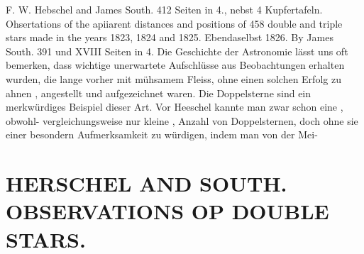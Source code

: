 \documentclass[12pt,a4paper]{article}
\begin{document}
{{{{{{{{ F.  W.  Hebschel and  James  South.    412  Seiten  in  4.,  nebst  4  Kupfertafeln. Ohsertations  of  the  apiiarent  distances  and  positions  of  458  double  and  triple  stars  made  in  the  years 1823,  1824  and  1825.     Ebendaselbst  1826.     By  James  South.     391  und  XVIII  Seiten  in  4. Die  Geschichte  der  Astronomie  lässt  uns  oft  bemerken,  dass  wichtige  unerwartete  Aufschlüsse aus  Beobachtungen  erhalten  wurden,  die  lange  vorher  mit  mühsamem  Fleiss,  ohne  einen  solchen  Erfolg zu  ahnen ,  angestellt  und  aufgezeichnet  waren.  Die  Doppelsterne  sind  ein  merkwürdiges  Beispiel  dieser Art.  Vor  Heeschel  kannte  man  zwar  schon  eine ,  obwohl-  vergleichungsweise  nur  kleine ,  Anzahl  von Doppelsternen,  doch  ohne  sie  einer  besondern  Aufmerksamkeit  zu  würdigen,    indem   man  von  der  Mei-


\section*{HERSCHEL  AND  SOUTH.    OBSERVATIONS  OP  DOUBLE  STARS.}

}}}}}}}}
\end{document}
